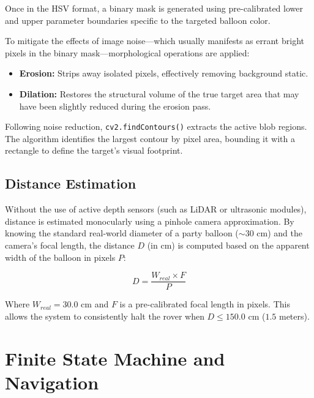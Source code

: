 \documentclass[12pt,a4paper]{article}
\begin{document}
Once in the HSV format, a binary mask is generated using pre-calibrated lower and upper parameter boundaries specific to the targeted balloon color. 

To mitigate the effects of image noise—which usually manifests as errant bright pixels in the binary mask—morphological operations are applied:
\begin{itemize}
    \item \textbf{Erosion:} Strips away isolated pixels, effectively removing background static.
    \item \textbf{Dilation:} Restores the structural volume of the true target area that may have been slightly reduced during the erosion pass.
\end{itemize}

Following noise reduction, \texttt{cv2.findContours()} extracts the active blob regions. The algorithm identifies the largest contour by pixel area, bounding it with a rectangle to define the target's visual footprint.

\subsection{Distance Estimation}
Without the use of active depth sensors (such as LiDAR or ultrasonic modules), distance is estimated monocularly using a pinhole camera approximation. By knowing the standard real-world diameter of a party balloon ($\sim 30$ cm) and the camera's focal length, the distance $D$ (in cm) is computed based on the apparent width of the balloon in pixels $P$:

\begin{equation}
    D = \frac{W_{real} \times F}{P}
\end{equation}

Where $W_{real} = 30.0$ cm and $F$ is a pre-calibrated focal length in pixels. This allows the system to consistently halt the rover when $D \leq 150.0$ cm ($1.5$ meters).

\section{Finite State Machine and Navigation}
\end{document}
